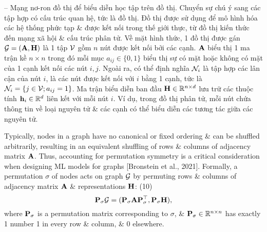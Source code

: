 \documentclass{article}
\begin{document}
\begin{itemize}
    -- {\sf Mạng nơ-ron đồ thị để biểu diễn học tập trên đồ thị.} Chuyển sự chú ý sang các tập hợp có cấu trúc quan hệ, tức là đồ thị. Đồ thị được sử dụng để mô hình hóa các hệ thống phức tạp \& được kết nối trong thế giới thực, từ đồ thị kiến thức đến mạng xã hội \& cấu trúc phân tử. Về mặt hình thức, 1 đồ thị được gán ${\cal G} = ({\bf A},{\bf H})$ là 1 tập ${\cal V}$ gồm $n$ nút được kết nối bởi các cạnh. ${\bf A}$ biểu thị 1 ma trận kề $n\times n$ trong đó mỗi mục $a_{ij}\in\{0,1\}$ biểu thị sự có mặt hoặc không có mặt của 1 cạnh kết nối các nút $i,j$. Ngoài ra, có thể định nghĩa ${\cal N}_i$ là tập hợp các lân cận của nút $i$, là các nút được kết nối với $i$ bằng 1 cạnh, tức là ${\cal N}_i = \{j\in{\cal V};a_{ij} = 1\}$. Ma trận biểu diễn ban đầu ${\bf H}\in\mathbb{R}^{n\times d}$ lưu trữ các thuộc tính ${\bf h}_i\in\mathbb{R}^d$ liên kết với mỗi nút $i$. Ví dụ, trong đồ thị phân tử, mỗi nút chứa thông tin về loại nguyên tử \& các cạnh có thể biểu diễn các tương tác giữa các nguyên tử.
    
    Typically, nodes in a graph have no canonical or fixed ordering \& can be shuffled arbitrarily, resulting in an equivalent shuffling of rows \& columns of adjacency matrix ${\bf A}$. Thus, accounting for permutation symmetry is a critical consideration when designing ML models for graphs [Bronstein et al., 2021]. Formally, a permutation $\sigma$ of nodes acts on graph ${\cal G}$ by permuting rows \& columns of adjacency matrix ${\bf A}$ \& representations ${\bf H}$: (10)
    \begin{equation*}
        {\bf P}_\sigma{\cal G} = ({\bf P}_\sigma{\bf A}{\bf P}_\sigma^\top,{\bf P}_\sigma{\bf H}),
    \end{equation*}
    where ${\bf P}_\sigma$ is a permutation matrix corresponding to $\sigma$, \& ${\bf P}_\sigma\in\mathbb{R}^{n\times n}$ has exactly 1 number 1 in every row \& column, \& 0 elsewhere.
        

\end{itemize}
\end{document}
